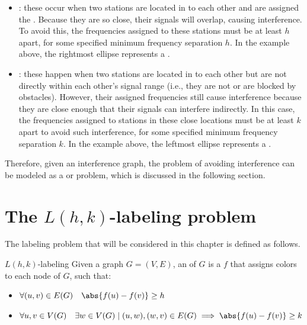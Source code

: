 \documentclass[a4paper, 12pt]{report}
\begin{document}
    \begin{itemize}
        \item {}: these occur when two stations are located in  to each other and are assigned the . Because they are so close, their signals will overlap, causing interference. To avoid this, the frequencies assigned to these stations must be at least $h$ apart, for some specified minimum frequency separation $h$. In the example above, the rightmost ellipse represents a .
        \item {}: these happen when two stations are located in  to each other but are not directly within each other's signal range (i.e., they are not  or are blocked by obstacles). However, their assigned frequencies still cause interference because they are close enough that their signals can interfere indirectly. In this case, the frequencies assigned to stations in these close locations must be at least $k$ apart to avoid such interference, for some specified minimum frequency separation $k$. In the example above, the leftmost ellipse represents a .
    \end{itemize}

    Therefore, given an interference graph, the problem of avoiding interference can be modeled as a  or  problem, which is discussed in the following section.

    \section{The $L(h, k)$-labeling problem}

    The labeling problem that will be considered in this chapter is defined as follows.

    \begin{frameddefn}{$L(h, k)$-labeling}
        Given a graph $G= (V, E)$, an  of $G$ is a  $f$ that assigns colors to each node of $G$, such that:

        \begin{itemize}
            \item $\forall (u, v) \in E(G) \quad \abs{f(u) - f(v)} \ge h$
            \item $\forall u, v \in V(G) \quad \exists w \in V(G) \mid (u, w), (w, v) \in E(G) \implies \abs{f(u) - f(v)} \ge k$
        \end{itemize}
    \end{frameddefn}
\end{document}
